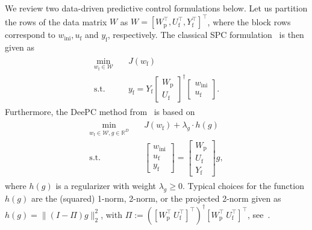 \documentclass[letterpaper, 10 pt, conference]{ieeeconf}
\def\wf{w_\mathrm{f}}
\def\wi{w_\mathrm{ini}}
\def\uf{u_\mathrm{f}}
\def\yf{y_\mathrm{f}}
\def\Wd{W}
\begin{document}
 
We review two data-driven predictive control formulations below. 
Let us partition the rows of the data matrix $\Wd$ as $\Wd = [W_\mathrm{p}^\top,U_\mathrm{f}^\top,Y_\mathrm{f}^\top]^\top$, where the block rows correspond to $\wi,\uf$ and $\yf$, respectively.
The classical \gls{SPC} formulation~\cite{favoreel1999spc,markovsky2022data} is then given as
\begin{align} \label{eq:SPC}
\begin{split}
    \min_{\wf\in \mathcal{W}} & \quad  J(\wf) \\
    \mathrm{s.t.} & \quad \yf = Y_\mathrm{f} \begin{bmatrix}
        W_\mathrm{p} \\ U_\mathrm{f}
    \end{bmatrix}^{\dagger} \begin{bmatrix}
        \wi \\ \uf
    \end{bmatrix}.
\end{split}
\end{align}
\vspace{2mm}
Furthermore, the \gls{DeePC} method from~\cite{dorfler2022bridging} is based on
\begin{align} \label{eq:DeePC}
\begin{split}
    \min_{\wf \in \mathcal{W},g\in\mathbb{R}^{D}} & \quad J(\wf) + \lambda_g \cdot h(g) \\
    \mathrm{s.t.} & \quad \begin{bmatrix}
        \wi \\ \uf \\ \yf
    \end{bmatrix} = \begin{bmatrix}
        W_\mathrm{p} \\ U_\mathrm{f}\\ Y_\mathrm{f}
    \end{bmatrix} g,
\end{split}
\end{align}
where $h(g)$ is a regularizer with weight $\lambda_g \geq 0$. 
Typical choices for the function $h(g)$ are the (squared) 1-norm, 2-norm, or the projected 2-norm given as $h(g) = \|(I-\Pi)g\|_2^2$, with $\Pi:=
([W_\mathrm{p}^\top~ U_\mathrm{f}^\top]^\top)^\dagger[W_\mathrm{p}^\top~ U_\mathrm{f}^\top]^\top$, see~\cite{markovsky2022data,dorfler2022bridging}.
\end{document}
